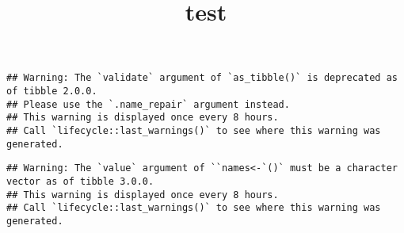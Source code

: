 \documentclass[
]{article}
\title{test}
\author{}
\date{\vspace{-2.5em}}
\begin{document}
\maketitle

{
\setcounter{tocdepth}{2}
\tableofcontents
}
\begin{verbatim}
## Warning: The `validate` argument of `as_tibble()` is deprecated as of tibble 2.0.0.
## Please use the `.name_repair` argument instead.
## This warning is displayed once every 8 hours.
## Call `lifecycle::last_warnings()` to see where this warning was generated.
\end{verbatim}

\begin{verbatim}
## Warning: The `value` argument of ``names<-`()` must be a character vector as of tibble 3.0.0.
## This warning is displayed once every 8 hours.
## Call `lifecycle::last_warnings()` to see where this warning was generated.
\end{verbatim}

\needspace{2cm}
\end{document}
